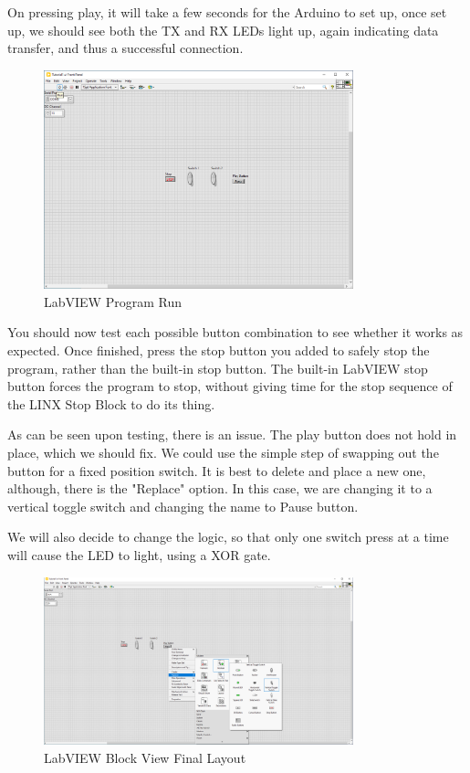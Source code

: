 \documentclass[a4paper,11pt]{report}
\begin{document}
On pressing play, it will take a few seconds for the Arduino to set up, once set up, we should see both the TX and RX LEDs light up, again indicating data transfer, and thus a successful connection.

\begin{figure}[H]
\centering
\includegraphics[width=0.8\textwidth]{screenshots/labview30}
\caption{LabVIEW Program Run}
\end{figure}

You should now test each possible button combination to see whether it works as expected. Once finished, press the stop button you added to safely stop the program, rather than the built-in stop button. The built-in LabVIEW stop button forces the program to stop, without giving time for the stop sequence of the LINX Stop Block to do its thing.

As can be seen upon testing, there is an issue. The play button does not hold in place, which we should fix. We could use the simple step of swapping out the button for a fixed position switch. It is best to delete and place a new one, although, there is the "Replace" option. In this case, we are changing it to a vertical toggle switch and changing the name to Pause button.

We will also decide to change the logic, so that only one switch press at a time will cause the LED to light, using a XOR gate.

\begin{figure}[H]
\centering
\includegraphics[width=0.8\textwidth]{screenshots/labview31}
\caption{LabVIEW Block View Final Layout}
\end{figure}
\end{document}
